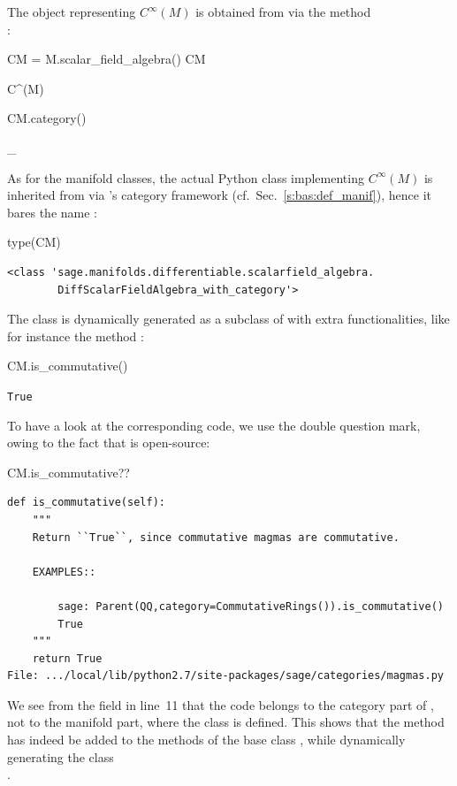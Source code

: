 The \Sage{} object representing $C^\infty(M)$ is obtained from  via the
method\\ :
\begin{NBin}
CM = M.scalar_field_algebra()
CM
\end{NBin}
\begin{NBoutM}
C^{\infty}\left(M\right)
\end{NBoutM}
\begin{NBin}
CM.category()
\end{NBin}
\begin{NBoutM}
_{}
\end{NBoutM}
As for the manifold classes, the actual Python class implementing
$C^\infty(M)$ is inherited from  via \Sage{}'s
category framework (cf.\ Sec.~\ref{s:bas:def_manif}), hence it bares the name :
\begin{NBin}
type(CM)
\end{NBin}
\begin{NBout}
\begin{verbatim}
<class 'sage.manifolds.differentiable.scalarfield_algebra.
        DiffScalarFieldAlgebra_with_category'>
\end{verbatim}
\end{NBout}
The class  is dynamically generated
as a subclass of  with extra functionalities, like
for instance the method :
\begin{NBin}
CM.is_commutative()
\end{NBin}
\begin{NBout}
\texttt{True}
\end{NBout}
To have a look at the corresponding code,
we use the double question mark, owing to the fact that \Sage{} is open-source:
\begin{NBin}
CM.is_commutative??
\end{NBin}
\begin{lstlisting}
def is_commutative(self):
    """
    Return ``True``, since commutative magmas are commutative.

    EXAMPLES::

        sage: Parent(QQ,category=CommutativeRings()).is_commutative()
        True
    """
    return True
File: .../local/lib/python2.7/site-packages/sage/categories/magmas.py
\end{lstlisting}
We see from the  field in line~11 that the code belongs to the category part of \Sage{}, not to the
manifold part, where the class  is defined.
This shows that the method  has indeed be
added to the methods of the base class , while
dynamically generating the class \\ .

